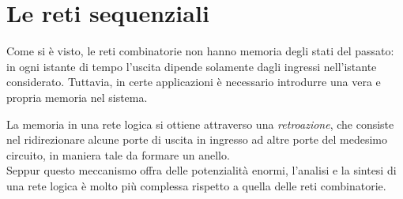 \documentclass[class=book, crop=false, oneside]{standalone}
\begin{document}
\section{Le reti sequenziali}
Come si è visto, le reti combinatorie non hanno memoria degli stati del passato: in ogni istante di tempo l’uscita dipende solamente dagli ingressi nell’istante considerato. Tuttavia, in certe applicazioni è necessario introdurre una vera e propria memoria nel sistema.

La memoria in una rete logica si ottiene attraverso una \emph{retroazione}, che consiste nel ridirezionare alcune porte di uscita in ingresso ad altre porte del medesimo circuito, in maniera tale da formare un anello.\\
Seppur questo meccanismo offra delle potenzialità enormi, l'analisi e la sintesi di una rete logica è molto più complessa rispetto a quella delle reti combinatorie.
\end{document}
